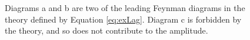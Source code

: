 \begin{figure}[h]
\centering
\caption{Diagrams a and b are two of the leading Feynman diagrams in the theory defined by Equation \ref{eq:exLag}. Diagram c is forbidden by the theory, and so does not contribute to the amplitude. }
\label{fig:Feyn}
\end{figure}

